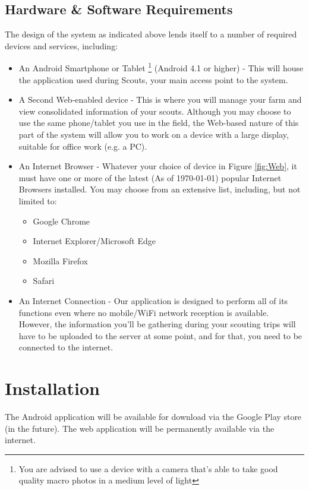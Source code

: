 \documentclass[11pt,a4paper,titlepage]{article}
\begin{document}
\subsection{Hardware \& Software Requirements}
The design of the system as indicated above lends itself to a number of required devices and services, including:
	\begin{itemize}
		\item An Android Smartphone or Tablet \footnote{You are advised to use a device with a camera that's able to take good quality macro photos in a medium level of light} (Android 4.1 or higher) - This will house the application used during Scouts, your main access point to the system.
		\item A Second Web-enabled device - This is where you will manage your farm and view consolidated information of your scouts. Although you may choose to use the same phone/tablet you use in the field, the Web-based nature of this part of the system will allow you to work on a device with a large display, suitable for office work (e.g. a PC).
		\item An Internet Browser - Whatever your choice of device in Figure \ref{fig:Web}, it must have one or more of the latest (As of \monthyeardate\today) popular Internet Browsers installed. You may choose from an extensive list, including, but not limited to:
		\begin{itemize}
			\item Google Chrome
			\item Internet Explorer/Microsoft Edge
			\item Mozilla Firefox
			\item Safari
		\end{itemize}
		\item An Internet Connection - Our application is designed to perform all of its functions even where no mobile/WiFi network reception is available. However, the information you'll be gathering during your scouting trips will have to be uploaded to the server at some point, and for that, you need to be connected to the internet. 		
	\end{itemize}



\section{Installation}
The Android application will be available for download via the Google Play store (in the future). The web application will be permanently available via the internet.
		
\end{document}
